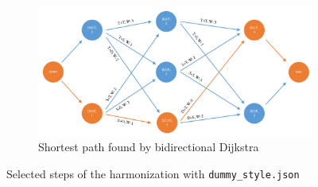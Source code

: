 \begin{figure}[!tbp]
\begin{subfigure}[b]{1.2\linewidth}
   \hspace{-1.1cm}\includegraphics[width=\linewidth]{Chapters/pic/44}
   \hspace{-1.1cm}\caption{Shortest path found by bidirectional Dijkstra}
   \label{fig:44}
\end{subfigure}

\caption{Selected steps of the harmonization with \texttt{dummy\_style.json}}
\label{fig:4}
\end{figure}


